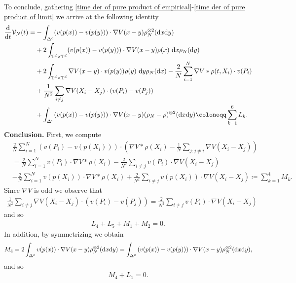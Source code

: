 \documentclass[11pt,reqno]{amsart}
\numberwithin{equation}{section}
\def\dd{{\rm d}}
\begin{document}
To conclude, gathering \eqref{time der of pure product of empirical}-\eqref{time der of pure product of limit} we arrive at the following identity 
\begin{align}
\frac{\dd}{\dd t}\mathcal{V}_{N}(t)=
&-\int_{\Delta^{c}}(v(p(x))-v(p(y)))\cdot \nabla V(x-y)\rho_{N}^{\otimes 2}(\dd x\dd y) \notag\\
&+2\int_{\mathbb{T}^{d}\times \mathbb{T}^{d}}(v(p(x))-v(p(y)))\cdot \nabla V(x-y)\rho(x)\ \dd x\rho_{N}(\dd y) \notag\\
&+2\int_{\mathbb{T}^{d}\times \mathbb{T}^{d}}\nabla V(x-y)\cdot v(p(y))\rho(y)\ \dd y\rho_{N}(\dd x)-\frac{2}{N}\sum_{i=1}^{N}\nabla V\ast \rho(t,X_{i})\cdot v(P_{i}) \notag\\
&+\frac{1}{N^{2}}\sum_{i\neq j}\nabla V(X_{i}-X_{j})\cdot (v(P_{i})-v(P_{j})) \notag\\
&+\int_{\Delta^{c}}(v(p(x))-v(p(y)))\cdot \nabla V(x-y)(\rho_{N}-\rho)^{\otimes 2}(\dd x\dd y)\coloneqq\sum_{k=1}^{6}L_{k}. 
\label{sum of the Lk}
\end{align}
\textbf{Conclusion.} 
First, we compute 
\begin{align*}
 &\frac{2}{N}\sum_{i=1}^{N}(v(P_{i})-v(p(X_{i})))\cdot \left(\nabla V\ast \rho(X_{i})-\frac{1}{N}\sum_{j:j\neq i}\nabla V(X_{i}-X_{j})\right) \\
 &=\frac{2}{N}\sum_{i=1}^{N}v(P_{i})\cdot \nabla V\ast \rho(X_{i})-\frac{2}{N^{2}}\sum_{i\neq j}v(P_{i})\cdot \nabla V(X_{i}-X_{j})\\
 &-\frac{2}{N}\sum_{i=1}^
 {N}v(p(X_{i}))\cdot \nabla V\ast \rho(X_{i})+\frac{2}{N^{2}}\sum_{i\neq j}v(p(X_{i}))\cdot \nabla V(X_{i}-X_{j})\coloneqq\sum_{k=1}^{4}M_{k}.  
\end{align*}
Since $\nabla V$ is odd we observe that 
\begin{align*}
\frac{1}{N^{2}}\sum_{i\neq j}\nabla V(X_{i}-X_{j})\cdot (v(P_{i})-v(P_{j}))=\frac{2}{N^{2}}\sum_{i\neq j}v(P_{i})\cdot \nabla V(X_{i}-X_{j})
\end{align*}
and so  
\begin{align}
L_{4}+L_{5}+M_{1}+M_{2}=0.  \label{first vanishing}   
\end{align}
In addition, by symmetrizing we obtain  
\begin{align*}
M_{4}=2\int_{\Delta^{c}}v(p(x))\cdot \nabla V(x-y)\rho_{N}^{\otimes 2}(\dd x\dd y)=\int_{\Delta^{c}}\left(v(p(x))-v(p(y))\right)\cdot \nabla V(x-y)\rho_{N}^{\otimes 2}(\dd x\dd y),   
\end{align*}
and so 
\begin{align}
M_{4}+L_{1}=0. \label{second vanishing}    
\end{align}
\end{document}
